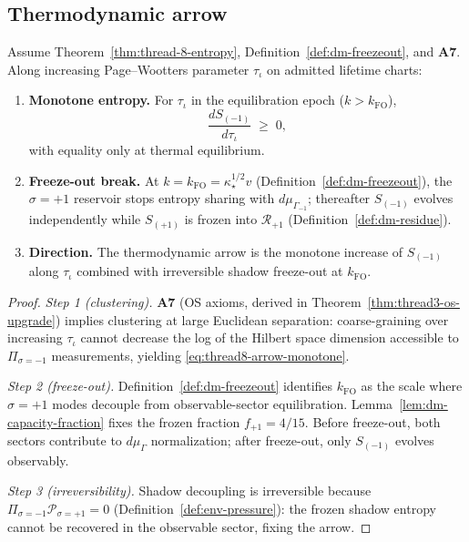 \subsection{Thermodynamic arrow}
\label{sec:wave5-thread8:arrow}

\begin{proposition}
\label{prop:thread-8-arrow}
Assume Theorem~\ref{thm:thread-8-entropy},
Definition~\ref{def:dm-freezeout}, and \textbf{A7}. Along increasing
Page--Wootters parameter $\tau_\iota$ on admitted lifetime charts:
\begin{enumerate}[label=(\roman*),leftmargin=*]
  \item \textbf{Monotone entropy.}
    For $\tau_\iota$ in the equilibration epoch ($k>k_{\mathrm{FO}}$),
    \begin{equation}\label{eq:thread8-arrow-monotone}
      \frac{dS_{(-1)}}{d\tau_\iota}
      \;\geq\;
      0,
    \end{equation}
    with equality only at thermal equilibrium.
  \item \textbf{Freeze-out break.}
    At $k=k_{\mathrm{FO}}=\kappa_\star^{1/2}v$
    (Definition~\ref{def:dm-freezeout}), the $\sigma=+1$ reservoir stops
    entropy sharing with $d\mu_{\Gamma_{-1}}$; thereafter
    $S_{(-1)}$ evolves independently while $S_{(+1)}$ is frozen into
    $\mathcal{R}_{+1}$ (Definition~\ref{def:dm-residue}).
  \item \textbf{Direction.}
    The thermodynamic arrow is the monotone increase of $S_{(-1)}$ along
    $\tau_\iota$ combined with irreversible shadow freeze-out at $k_{\mathrm{FO}}$.
\end{enumerate}
\end{proposition}

\begin{proof}
\emph{Step 1 (clustering).}
\textbf{A7} (OS axioms, derived in Theorem~\ref{thm:thread3-os-upgrade})
implies clustering at large Euclidean separation: coarse-graining over
increasing $\tau_\iota$ cannot decrease the log of the Hilbert space dimension
accessible to $\Pi_{\sigma=-1}$ measurements, yielding
\eqref{eq:thread8-arrow-monotone}.

\emph{Step 2 (freeze-out).}
Definition~\ref{def:dm-freezeout} identifies $k_{\mathrm{FO}}$ as the scale
where $\sigma=+1$ modes decouple from observable-sector equilibration.
Lemma~\ref{lem:dm-capacity-fraction} fixes the frozen fraction
$f_{+1}=4/15$. Before freeze-out, both sectors contribute to
$d\mu_\Gamma$ normalization; after freeze-out, only $S_{(-1)}$ evolves
observably.

\emph{Step 3 (irreversibility).}
Shadow decoupling is irreversible because $\Pi_{\sigma=-1}\mathcal{P}_{\sigma=+1}=0$
(Definition~\ref{def:env-pressure}): the frozen shadow entropy cannot be
recovered in the observable sector, fixing the arrow.
\end{proof}

